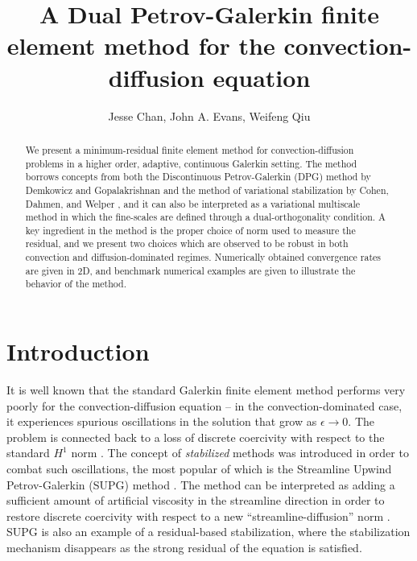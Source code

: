\documentclass[final,leqno]{siamltex}
\title{A Dual Petrov-Galerkin finite element method for the convection-diffusion equation}
\author{Jesse Chan, John A. Evans, Weifeng Qiu}
\date{}
\begin{document}
\maketitle

\begin{abstract}
We present a minimum-residual finite element method for convection-diffusion problems in a higher order, adaptive, continuous Galerkin setting.  The method borrows concepts from both the Discontinuous Petrov-Galerkin (DPG) method by Demkowicz and Gopalakrishnan \cite{DPG2} and the method of variational stabilization by Cohen, Dahmen, and Welper \cite{DahmenVariationalStabilization}, and it can also be interpreted as a variational multiscale method in which the fine-scales are defined through a dual-orthogonality condition.  A key ingredient in the method is the proper choice of norm used to measure the residual, and we present two choices which are observed to be robust in both convection and diffusion-dominated regimes.  Numerically obtained convergence rates are given in 2D, and benchmark numerical examples are given to illustrate the behavior of the method.
\end{abstract}


\section{Introduction}

It is well known that the standard Galerkin finite element method performs very poorly for the convection-diffusion equation -- in the convection-dominated case, it experiences spurious oscillations in the solution that grow as $\epsilon \rightarrow 0$.  The problem is connected back to a loss of discrete coercivity with respect to the standard $H^1$ norm \cite{roos2008robust}.  The concept of \textit{stabilized} methods was introduced in order to combat such oscillations, the most popular of which is the Streamline Upwind Petrov-Galerkin (SUPG) method \cite{SUPG}.  The method can be interpreted as adding a sufficient amount of artificial viscosity in the streamline direction in order to restore discrete coercivity with respect to a new ``streamline-diffusion'' norm \cite{johnsonCrosswind}.  SUPG is also an example of a residual-based stabilization, where the stabilization mechanism disappears as the strong residual of the equation is satisfied.  
\end{document}
